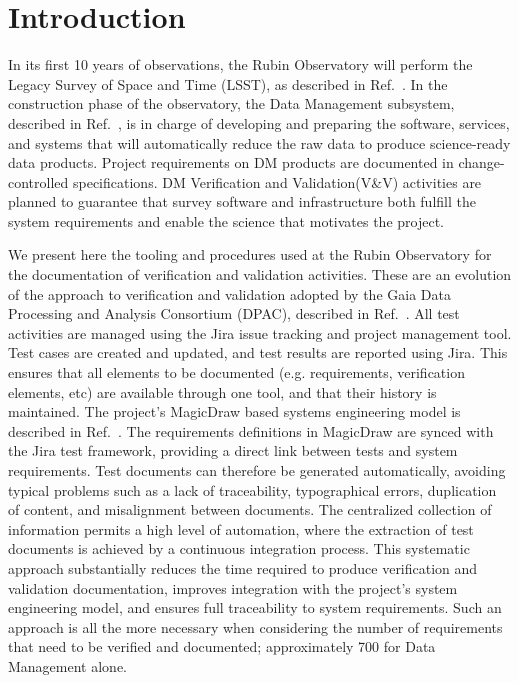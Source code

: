 \section{Introduction}

In its first 10 years of observations, the Rubin Observatory will perform the Legacy Survey of Space and Time (LSST), as described
in Ref.~. In the construction phase of the observatory, the Data Management subsystem,
described in Ref.~, is in charge of developing and preparing the
software, services, and systems that will automatically reduce the raw data to produce science-ready data products.
Project requirements on DM products are documented in change-controlled specifications. DM Verification and Validation(V\&V)
activities are planned to guarantee that survey software and infrastructure both fulfill the system requirements
and enable the science that motivates the project.

We present here the tooling and procedures used at the Rubin Observatory for the documentation of verification and validation activities.
These are an evolution of the approach to verification and validation adopted by the Gaia Data Processing and Analysis Consortium (DPAC), described in Ref.~.
All test activities are managed using the Jira issue tracking and project management tool. 
Test cases are created and updated, and test results are reported using Jira. 
This ensures that all elements to be documented (e.g. requirements, verification elements, etc) 
are available through one tool, and that their history is maintained.
The project's MagicDraw based systems engineering model is described in Ref.~. 
The requirements definitions in MagicDraw are synced with the Jira test framework, providing a direct link between tests and system requirements.
Test documents can therefore be generated automatically, avoiding typical problems such as a lack of traceability, typographical errors, duplication of content, and misalignment between documents. 
The centralized collection of information permits a high level of automation, where the extraction of test documents is
achieved by a continuous integration process. 
This systematic approach substantially reduces the time required to produce verification and validation documentation, improves integration with the project's system engineering model, and ensures full traceability to system requirements.
Such an approach is all the more necessary when considering the number of requirements that need to be verified and documented; approximately 700 for Data Management alone.

